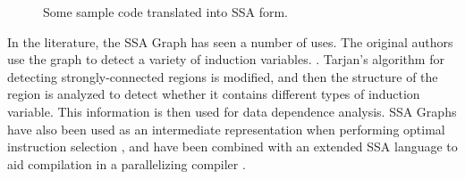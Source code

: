 \begin{figure}[ht]
\centering
{}
\caption{Some sample code translated into SSA form.}
\label{fig: ssa-graph-example-code}
\end{figure}

In the literature, the SSA Graph has seen a number of uses. The original authors use the graph to detect a variety of induction variables. \cite{143131,201003}. Tarjan's algorithm for detecting strongly-connected regions \cite{tarjan:scr} is modified, and then the structure of the region is analyzed to detect whether it contains different types of induction variable. This information is then used for data dependence analysis. SSA Graphs have also been used as an intermediate representation when performing optimal instruction selection \cite{1375663}, and have been combined with an extended SSA language to aid compilation in a parallelizing compiler \cite{Stoltz_extendedssa}.

